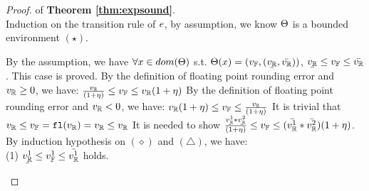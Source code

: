 \documentclass[a4paper,11pt]{article}
\begin{document}
\begin{proof} of \textbf{Theorem \ref{thm:expsound}}.
%
\\
%
Induction on the transition rule of $e$, by assumption, we know $\Theta$ is a bounded environment $(\star)$.
%
	\begin{itemize}
%
	\caseL{
	\[\inferrule*[right = var]
		{
			\trsenv(\varx) 
			= (\fval, ( \ubar{\rval}, \bar{\rval} ))
		}
		{
			\trsenv, \varx
			\trsto
			(\fval, ( \ubar{\rval}, \bar{\rval} ))
		}\]
		}
	By the assumption, we have $\forall x \in dom(\Theta)$ s.t. $\trsenv(\varx) = (\fval, (\ubar{\rval}, \bar{\rval}))$, 
	$\ubar{\rval} \leq \fval \leq \bar{\rval}$.
	This case is proved.
	\caseL{
	\[\inferrule*[right = val]
		{
			\fval = \floaten(\rval)
			\and
			\fval \neq \rval
			\and
			\rval \geq 0
		}
		{
			\trsenv, \rval
			\trsto
			\big(\fval, 
			(\frac{\rval}{(1 + \eta)}, \rval(1 + \eta)) 
			\big)
		}
		\]
	}
	By the definition of floating point rounding error and $v_{\mathbb{R}} \geq 0$, we have:
	$\frac{v_{\mathbb{R}}}{(1 + \eta)}
	\leq v_{\mathbb{F}} \leq
	v_{\mathbb{R}}(1 + \eta)$
	\caseL{\[
	\inferrule*[right = val-neg]
	{
		\fval = \floaten(\rval) 
		\and
		\fval \neq \rval
		\and
		\rval < 0
	}
	{
		\trsenv, \rval
		\trsto
		\big(\fval, (\rval(1 + \eta), \frac{\rval}{(1 + \eta)}) \big)
	}
	\]}
	By the definition of floating point rounding error and $v_{\mathbb{R}} < 0$, we have:
	$v_{\mathbb{R}}(1 + \eta)
	\leq v_{\mathbb{F}} \leq
	\frac{v_{\mathbb{R}}}{(1 + \eta)}$
	\caseL{\[
		\inferrule*[right = val-eq]
		{
			\fval = \floaten(\rval)
			~~~~
			\fval = \rval
		}
		{
			\trsenv, \rval
			\trsto
			(\fval, (\rval, \rval) )
		}
	\]}
	It is trivial that $v_{\mathbb{R}} \leq v_{\mathbb{F}} = \mathtt{fl}(v_{\mathbb{R}}) = v_{\mathbb{R}} \leq v_{\mathbb{R}}$
	\caseL{\[
	\inferrule*[right = bop-pp]
	{
		\trsenv, \expr_1 \trsto (\fval^1, (\ubar{\rval^1}, \bar{\rval^1})) ~ (\diamond)
		~~~
		\trsenv, \expr_2 \trsto (\fval^2, (\ubar{\rval^2}, \bar{\rval^2})) ~ (\triangle)
		~~~
		\fval^1 \geq 0
		~~~
		\fval^2 \geq 0
		~~~
		\fval = \floaten(\fval^1 * \fval^2)
		~~~
		* \in \{\times, \div \}
	}
	{
	    \trsenv, \expr_1 * \expr_2
	    \trsto
	    \big(
	    \fval,
	    (\frac{\ubar{\rval^1} * \ubar{\rval^2}}{(1 + \eta)}, 
	    (\bar{\rval^1} * \bar{\rval^2})(1 + \eta))
	    \big)
	}
	\]}
	It is needed to show $\frac{\ubar{\rval^1} * \ubar{\rval^2}}{(1 + \eta)}
	\leq \fval \leq 
	(\bar{\rval^1} * \bar{\rval^2})(1 + \eta)$.\\
	By induction hypothesis on $(\diamond)$ and $(\triangle)$, we have:\\
	(1) $\ubar{\rval^1} \leq \fval^1 \leq \bar{\rval^1}$ holds. 

\end{itemize}
\end{proof}
\end{document}
